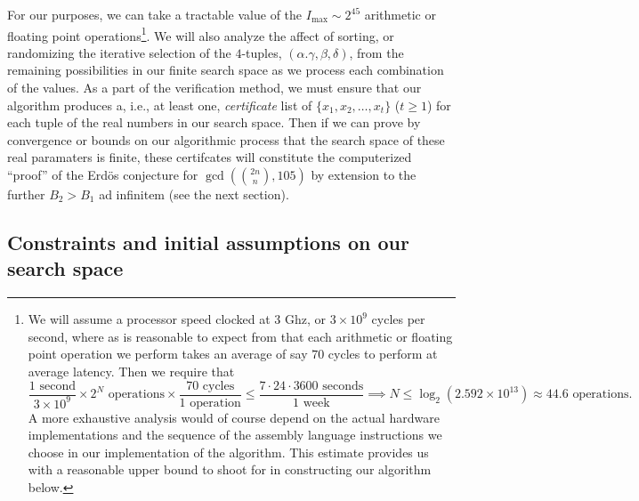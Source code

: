 \documentclass[12pt]{article}
\begin{document}
For our purposes, we can take a tractable value of the $I_{\max} \sim 2^{45}$ arithmetic or floating point 
operations\footnote{ 
     We will assume a processor speed clocked at 3 Ghz, or $3 \times 10^9$ cycles per second, 
     where as is reasonable to expect from 
     \cite{INST-TABLES-REF} that each arithmetic or floating point operation we perform takes an 
     average of say $70$ cycles to perform at average latency. Then we require that 
     \[
     \frac{1\text{ second}}{3 \times 10^9} \times 2^N \text{ operations} \times 
          \frac{70\text{ cycles}}{1\text{ operation}} \leq \frac{7 \cdot 24 \cdot 3600 \text{ seconds}}{ 
          1\text{ week}} \implies 
          N \leq \log_2(2.592 \times 10^{13}) \approx 44.6 \text{ operations}. 
     \] 
     A more exhaustive analysis would of course depend on the actual hardware implementations and the 
     sequence of the assembly language instructions we choose in our implementation of the 
     algorithm. This estimate provides us with a reasonable upper bound to shoot for in 
     constructing our algorithm below. 
}. We will also analyze the affect of sorting, or randomizing the iterative selection of the 
$4$-tuples, $(\alpha.\gamma,\beta,\delta)$, from the remaining possibilities in our finite search space 
as we process each combination of the values. As a part of the verification method, we must ensure that 
our algorithm produces a, i.e., at least one, 
\emph{certificate} list of $\{x_1,x_2,\ldots,x_t\}$ ($t \geq 1$) for each tuple of the real numbers in 
our search space. Then if we can prove by convergence or bounds on our algorithmic process that the 
search space of these real paramaters is finite, these certifcates will constitute the 
computerized ``proof'' of the Erd\"os conjecture for $\gcd(\binom{2n}{n}, 105)$ by extension to the 
further $B_2 > B_1$ ad infinitem (see the next section). 

\subsection{Constraints and initial assumptions on our search space} 
\end{document}
